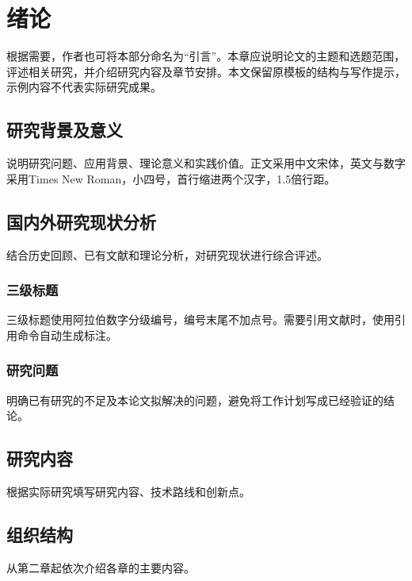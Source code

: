 \chapter{绪论}
根据需要，作者也可将本部分命名为“引言”。本章应说明论文的主题和选题范围，评述相关研究，并介绍研究内容及章节安排。本文保留原模板的结构与写作提示，示例内容不代表实际研究成果。
\section{研究背景及意义}
说明研究问题、应用背景、理论意义和实践价值。正文采用中文宋体，英文与数字采用Times New Roman，小四号，首行缩进两个汉字，1.5倍行距。
\section{国内外研究现状分析}
结合历史回顾、已有文献和理论分析，对研究现状进行综合评述。
\subsection{三级标题}
三级标题使用阿拉伯数字分级编号，编号末尾不加点号。需要引用文献时，使用引用命令自动生成标注。
\subsection{研究问题}
明确已有研究的不足及本论文拟解决的问题，避免将工作计划写成已经验证的结论。
\section{研究内容}
根据实际研究填写研究内容、技术路线和创新点。
\section{组织结构}
从第二章起依次介绍各章的主要内容。

